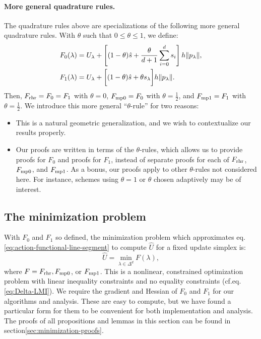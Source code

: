 \documentclass[smallcondensed]{svjour3}
\begin{document}
\paragraph{More general quadrature rules.} The quadrature rules above
are specializations of the following more general quadrature
rules. With $\theta$ such that $0 \leq \theta \leq 1$, we define:
\begin{align}
  F_0(\lambda) &= U_\lambda + \left[(1 - \theta)\hat{s} + \frac{\theta}{d+1} \sum_{i=0}^d s_i\right] h \|p_\lambda\|, \\
  F_1(\lambda) &= U_\lambda + \bigg[ (1 - \theta)\hat{s} + \theta s_\lambda \bigg] h \|p_\lambda\|.
\end{align}
Then, $F_{\operatorname{rhr}} = F_0 = F_1$ with $\theta = 0$, $F_{\operatorname{mp0}} = F_0$ with
$\theta = \tfrac{1}{2}$, and $F_{\operatorname{mp1}} = F_1$ with
$\theta = \tfrac{1}{2}$. We introduce this more general
``$\theta$-rule'' for two reasons:
\begin{itemize}
\item This is a natural geometric generalization, and we wish
  to contextualize our results properly.
\item Our proofs are written in terms of the $\theta$-rules, which
  allows us to provide proofs for $F_0$ and proofs for $F_1$, instead
  of separate proofs for each of $F_{\operatorname{rhr}}$, $F_{\operatorname{mp0}}$, and
  $F_{\operatorname{mp1}}$. As a bonus, our proofs apply to other $\theta$-rules not
  considered here. For instance, schemes using $\theta = 1$ or
  $\theta$ chosen adaptively may be of interest.
\end{itemize}

\subsection{The minimization problem}\label{ssec:minimization-problem}

With $F_0$ and $F_1$ so defined, the minimization problem which
approximates eq.\@ \ref{eq:action-functional-line-segment} to
compute $\hat{U}$ for a fixed update simplex is:
\begin{equation}
  \label{eq:constrained-minimization}
  \hat{U} = \min_{\lambda \in \Delta^d} F(\lambda),
\end{equation}
where $F = F_{\operatorname{rhr}}, F_{\operatorname{mp0}}$, or $F_{\operatorname{mp1}}$. This is a nonlinear,
constrained optimization problem with linear inequality constraints
and no equality constraints (cf.\@ eq.\@ \ref{eq:Delta-LMI}). We
require the gradient and Hessian of $F_0$ and $F_1$ for our algorithms
and analysis. These are easy to compute, but we have found a
particular form for them to be convenient for both implementation and
analysis. The proofs of all propositions and lemmas in this section
can be found in section\@ \ref{sec:minimization-proofs}.
\end{document}
